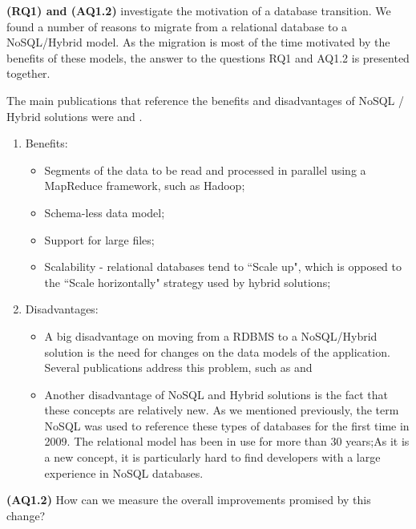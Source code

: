 \documentclass{article}
\begin{document}
{\textbf{(RQ1) and (AQ1.2)} investigate the motivation of a database transition. We found a number of reasons to migrate from a relational database to a NoSQL/Hybrid model. As the migration is most of the time motivated by the benefits of these models, the answer to the questions RQ1 and AQ1.2 is presented together. 

 The main publications that reference the benefits and disadvantages of NoSQL / Hybrid solutions  were \cite{Schram:2012:MND:2384716.2384773} \cite{buazuartransition} and \cite{gomez2014building}.

\begin{enumerate}
    \item Benefits: 
\begin{itemize}
  \item Segments of the data to be read and processed in parallel using a MapReduce framework, such as Hadoop;
  \item Schema-less data model;
  \item Support for large files;
  \item Scalability - relational databases tend to ``Scale up", which is opposed to the ``Scale horizontally" strategy used by hybrid solutions;
\end{itemize}

    \item Disadvantages:
    \begin{itemize}
    \item A big disadvantage on moving from a RDBMS to a NoSQL/Hybrid solution is the need for changes on the data models of the application. Several publications address this problem, such as \cite{Schram:2012:MND:2384716.2384773} \cite{Cattell:2011:SSN:1978915.1978919} and \cite{Mohan:2013:HRI:2452376.2452378}
    \item Another disadvantage of NoSQL and Hybrid solutions is the fact that these concepts are relatively new. As we mentioned previously, the term NoSQL was used to reference these types of databases for the first time in 2009\cite{ericevans}. The relational model has been in use for more than 30 years;As it is a new concept, it is particularly hard to find developers with a large experience in NoSQL databases.
\end{itemize}
    

\end{enumerate}


{\textbf{(AQ1.2)} How can we measure the overall improvements promised by this change?

}}
\end{document}
